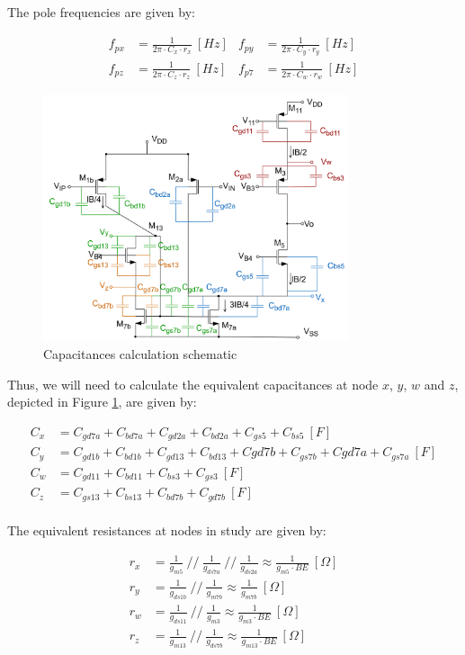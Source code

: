 The pole frequencies are given by:

\begin{align}
    f_{px} &= \frac{1}{2\pi \cdot C_x \cdot r_x} \ [Hz] &
    f_{py} &= \frac{1}{2\pi \cdot C_y \cdot r_y} \ [Hz] \\
    f_{pz} &= \frac{1}{2\pi \cdot C_z \cdot r_z} \ [Hz] &
    f_{p7} &= \frac{1}{2\pi \cdot C_w \cdot r_w} \ [Hz]
    \label{eq:poles}
\end{align}

\begin{figure}[H]
    \centering
    \includegraphics[width=0.8\textwidth]{Images/pole_freqs.png}
    \caption{Capacitances calculation schematic}
    \label{fig:poles_sch}
\end{figure}

Thus, we will need to calculate the equivalent capacitances at node $x$, $y$, $w$ and $z$, depicted in Figure \ref{fig:poles_sch}, are given by:

\begin{align}
    C_x &= C_{gd7a} + C_{bd7a}+ C_{gd2a} + C_{bd2a} + C_{gs5} + C_{bs5} \ [F] \\
    C_y &= C_{gd1b} + C_{bd1b} + C_{gd13} + C_{bd13} + C{gd7b} + C_{gs7b} + C{gd7a} + C_{gs7a}\ [F] \\
    C_w &= C_{gd11} + C_{bd11} + C_{bs3}+ C_{gs3} \ [F] \\
    C_z &= C_{gs13} + C_{bs13} + C_{bd7b}+ C_{gd7b} \ [F] 
    \label{eq:capacitances}
\end{align}
\\
The equivalent resistances at nodes in study are given by:

\begin{align}
    r_x &= \frac{1}{g_{m5}} \ // \ \frac{1}{g_{ds7a}} \ // \ \frac{1}{g_{ds2a}}\approx \frac{1}{g_{m5} \cdot BE} \ [\Omega]\\
    r_y &= \frac{1}{g_{ds1b}} \ // \ \frac{1}{g_{m7b}} \approx \frac{1}{g_{m7b}} \ [\Omega]\\
    r_w &= \frac{1}{g_{ds11}} \ // \ \frac{1}{g_{m3}} \approx \frac{1}{g_{m3} \cdot BE} \ [\Omega]\\
    r_z &= \frac{1}{g_{m13}} \ // \ \frac{1}{g_{ds7b}} \approx \frac{1}{g_{m13} \cdot BE} \ [\Omega]
    \label{eq:resistances}
\end{align}

